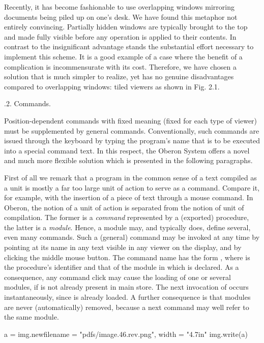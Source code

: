 Recently, it has become fashionable to use overlapping windows
mirroring documents being piled up on one's desk. We have found this
metaphor not entirely convincing. Partially hidden windows are
typically brought to the top and made fully visible before any
operation is applied to their contents. In contrast to the
insignificant advantage stands the substantial effort necessary to
implement this scheme. It is a good example of a case where the
benefit of a complication is incommensurate with its cost. Therefore,
we have chosen a solution that is much simpler to realize, yet has no
genuine disadvantages compared to overlapping windows: tiled viewers
as shown in Fig. 2.1.


.2. Commands.

Position-dependent commands with fixed meaning (fixed
for each type of viewer) must be supplemented by general
commands. Conventionally, such commands are issued through the
keyboard by typing the program's name that is to be executed into a
special command text. In this respect, the Oberon System offers a
novel and much more flexible solution which is presented in the
following paragraphs.

First of all we remark that a program in the
common sense of a text compiled as a unit is mostly a far too large
unit of action to serve as a command. Compare it, for example, with
the insertion of a piece of text through a mouse command. In Oberon,
the notion of a unit of action is separated from the notion of unit of
compilation. The former is a \emph{command} represented by a (exported)
procedure, the latter is a \emph{module}. Hence, a module may, and typically
does, define several, even many commands. Such a (general) command may be invoked at any time by pointing at its name in any text visible in any viewer on the display, and by clicking the middle mouse button. The command name has the form , where  is the procedure's identifier and  that of the module in which  is declared. As a consequence, any command click may cause the loading of one or several modules, if  is not already present in main store. The next invocation of  occurs instantaneously, since  is already loaded. A further consequence is that modules are never (automatically) removed, because a next command may well refer to the same module.

\medskip
{} {
  a = img.new{filename = "pdfs/image.46.rev.png", width = "4.7in"}
  img.write(a)
}

